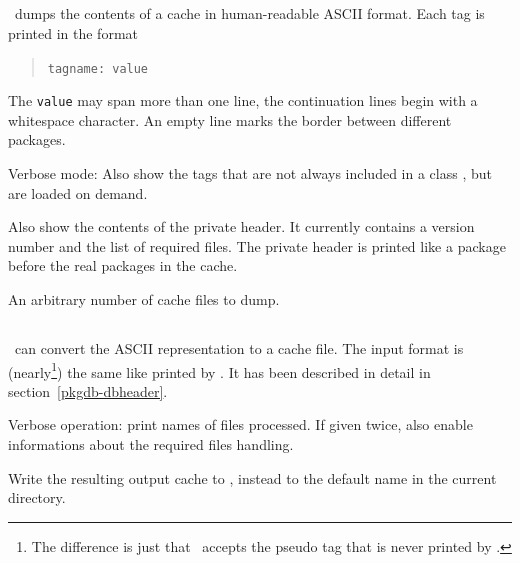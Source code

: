 \documentclass[10pt]{article}
\begin{document}
\endsynopsis


\subsection{\SUMTOASCIIPROG}

\SUMTOASCIIPROG\ dumps the contents of a cache in human-readable ASCII
format. Each tag is printed in the format
\begin{quote}
\texttt{tagname: value}
\end{quote}
The \texttt{value} may span more than one line, the continuation lines
begin with a whitespace character. An empty line marks the border
between different packages.


Verbose mode: Also show the tags that are not always included in a
class , but are loaded on demand.

Also show the contents of the  private header. It
currently contains a version number and the list of required files.
The private header is printed like a package before the real packages
in the cache.

An arbitrary number of cache files to dump.

\endsynopsis


\subsection{\ASCIITOSUMPROG}

\ASCIITOSUMPROG\ can convert the ASCII representation to a cache file.
The input format is (nearly\footnote{
  The difference is just that \ASCIITOSUMPROG\ accepts the
   pseudo tag that is never printed by \SUMTOASCIIPROG.})
the same like printed by \SUMTOASCIIPROG.
It has been described in detail in section~\ref{pkgdb-dbheader}.


Verbose operation: print names of files processed. If given twice,
also enable informations about the required files handling.

Write the resulting output cache to , instead to the
default name \INFOFILENAME in the current directory.
\end{document}
